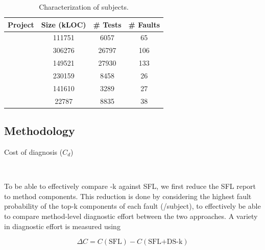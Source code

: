 \documentclass{article}
\begin{document}
\newcommand{\cgray}[1]{\cellcolor{gray!25}#1}
\begin{table}[h]
  \centering
  \setlength{\tabcolsep}{4pt}
    \begin{tabular}{lccc}
      \toprule
      Project            & Size (kLOC) & \# Tests & \# Faults \\ %
      \midrule
      \lang{}            & 111751  & 6057 & 65       \\   %
      \cmath{}           & 306276  & 26797 & 106     \\   %
      \closure{}         & 149521  & 27930  & 133     \\   %
      \chart{}           & 230159  & 8458 & 26      \\  %
      \jtime{}           & 141610  & 3289 & 27       \\   %
      \mockito{}         & 22787  & 8835 & 38    \\     %
      \bottomrule
  \end{tabular}
\caption {Characterization of \dfj{} subjects.}
\label{tab:df4j}
\end{table}
\normalsize

\subsection{Methodology}

Cost of diagnosis ($C_d$)

~\cite{Parnin:2011:ADT:2001420.2001445}

To be able to effectively compare \comb{}-k against SFL, we first reduce the SFL report to method components. This reduction is done by considering the highest fault probability of the top-k components of each fault (/subject), to effectively be able to compare method-level diagnostic effort between the
two approaches. A variety in diagnostic effort is measured
using

\begin{equation}
    \Delta{}C = C(\textrm{SFL}) - C(\textrm{SFL+DS-k})
\end{equation}
\end{document}

